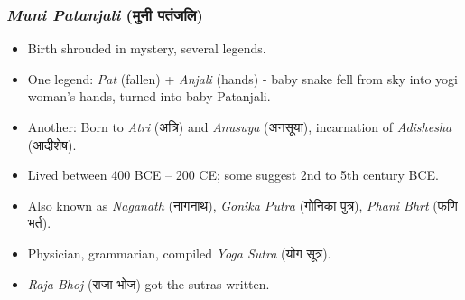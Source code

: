 \begin{frame}[fragile]\frametitle{\textit{Muni Patanjali} (मुनी पतंजलि)}

    \begin{itemize}
        \item Birth shrouded in mystery, several legends.
        \item One legend: \textit{Pat} (fallen) + \textit{Anjali} (hands) - baby snake fell from sky into yogi woman’s hands, turned into baby Patanjali.
        \item Another: Born to \textit{Atri} (अत्रि) and \textit{Anusuya} (अनसूया), incarnation of \textit{Adishesha} (आदीशेष).
        \item Lived between 400 BCE – 200 CE; some suggest 2nd to 5th century BCE.
        \item Also known as \textit{Naganath} (नागनाथ), \textit{Gonika Putra} (गोनिका पुत्र), \textit{Phani Bhrt} (फणि भर्त).
        \item Physician, grammarian, compiled \textit{Yoga Sutra} (योग सूत्र).
        \item \textit{Raja Bhoj} (राजा भोज) got the sutras written.
    \end{itemize}

\end{frame}





